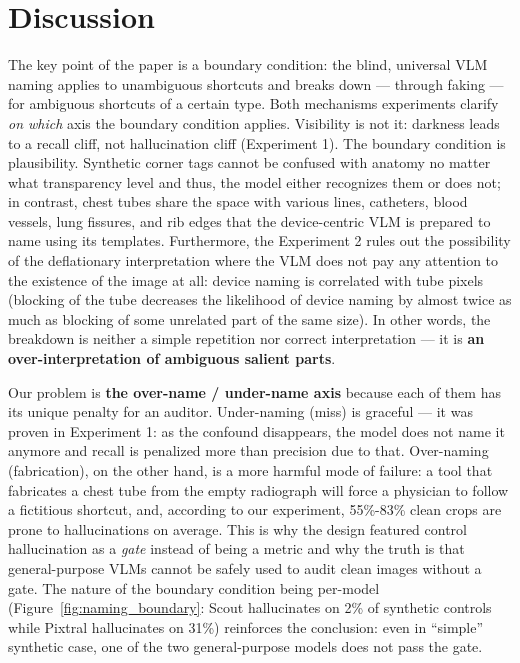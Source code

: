 \documentclass{ieeeaccess}
\begin{document}
\section{Discussion}
The key point of the paper is a boundary condition: the blind, universal VLM naming applies to unambiguous shortcuts and breaks down --- through faking --- for ambiguous shortcuts of a certain type. Both mechanisms experiments clarify \emph{on which} axis the boundary condition applies. Visibility is not it: darkness leads to a recall cliff, not hallucination cliff (Experiment 1). The boundary condition is plausibility. Synthetic corner tags cannot be confused with anatomy no matter what transparency level and thus, the model either recognizes them or does not; in contrast, chest tubes share the space with various lines, catheters, blood vessels, lung fissures, and rib edges that the device-centric VLM is prepared to name using its templates. Furthermore, the Experiment 2 rules out the possibility of the deflationary interpretation where the VLM does not pay any attention to the existence of the image at all: device naming is correlated with tube pixels (blocking of the tube decreases the likelihood of device naming by almost twice as much as blocking of some unrelated part of the same size). In other words, the breakdown is neither a simple repetition nor correct interpretation --- it is \textbf{an over-interpretation of ambiguous salient parts}.

Our problem is \textbf{the over-name / under-name axis} because each of them has its unique penalty for an auditor. Under-naming (miss) is graceful --- it was proven in Experiment 1: as the confound disappears, the model does not name it anymore and recall is penalized more than precision due to that. Over-naming (fabrication), on the other hand, is a more harmful mode of failure: a tool that fabricates a chest tube from the empty radiograph will force a physician to follow a fictitious shortcut, and, according to our experiment, 55\%-83\% clean crops are prone to hallucinations on average. This is why the design featured control hallucination as a \emph{gate} instead of being a metric and why the truth is that general-purpose VLMs cannot be safely used to audit clean images without a gate. The nature of the boundary condition being per-model (Figure~\ref{fig:naming_boundary}: Scout hallucinates on 2\% of synthetic controls while Pixtral hallucinates on 31\%) reinforces the conclusion: even in ``simple'' synthetic case, one of the two general-purpose models does not pass the gate.
\end{document}
